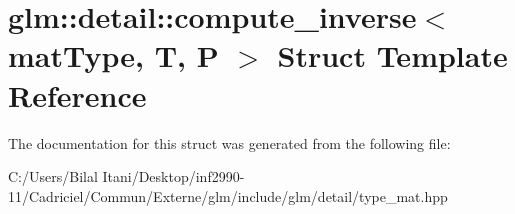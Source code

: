 \hypertarget{structglm_1_1detail_1_1compute__inverse}{}\section{glm\+:\+:detail\+:\+:compute\+\_\+inverse$<$ mat\+Type, T, P $>$ Struct Template Reference}
\label{structglm_1_1detail_1_1compute__inverse}


The documentation for this struct was generated from the following file\+:\begin{DoxyCompactItemize}
\item 
C\+:/\+Users/\+Bilal Itani/\+Desktop/inf2990-\/11/\+Cadriciel/\+Commun/\+Externe/glm/include/glm/detail/type\+\_\+mat.\+hpp\end{DoxyCompactItemize}
